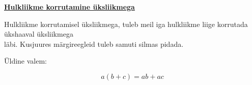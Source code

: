 \begin{center}
{{{\begin{flushleft}
\vspace{5mm}
\hspace{5mm}
\textbf{\underline{Hulkliikme korrutamine üksliikmega}}

\vspace{2mm}
\hspace{5mm}
Hulkliikme korrutamisel üksliikmega, tuleb meil iga hulkliikme liige korrutada ükshaaval üksliikmega\\ \hspace{5mm} läbi. Kusjuures märgireegleid tuleb samuti silmas pidada.

\vspace{2mm}
\hspace{5mm}
Üldine valem:

\begin{equation}
\label{22_eq1}
a(b+c)=ab+ac
\end{equation}

\end{flushleft}
}}}
\end{center}

\pagebreak

